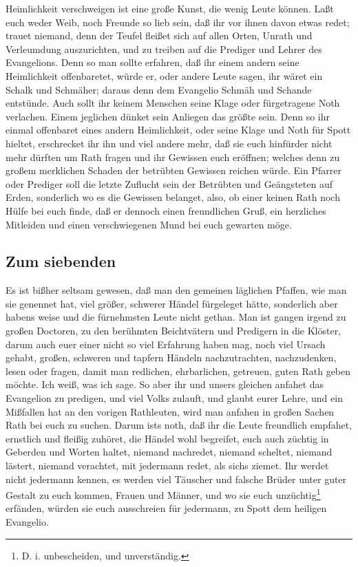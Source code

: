 Heimlichkeit verschweigen ist eine große Kunst, die wenig Leute können. Laßt euch weder Weib, noch Freunde so lieb sein, daß ihr vor ihnen davon etwas redet; trauet niemand, denn der Teufel fleißet sich auf allen Orten, Unrath und Verleumdung auszurichten, und zu treiben auf die Prediger und Lehrer des Evangelions. Denn so man sollte erfahren, daß ihr einem andern seine Heimlichkeit offenbaretet, würde er, oder andere Leute sagen, ihr wäret ein Schalk und Schmäher; daraus denn dem Evangelio Schmäh und Schande entstünde. Auch sollt ihr keinem Menschen seine Klage oder fürgetragene Noth verlachen. Einem jeglichen dünket sein Anliegen das größte sein. Denn so ihr einmal offenbaret eines andern Heimlichkeit, oder seine Klage und Noth für Spott hieltet, erschrecket ihr ihn und viel andere mehr, daß sie euch hinfürder nicht mehr dürften um Rath fragen und ihr
Gewissen euch eröffnen; welches denn zu großem merklichen Schaden der betrübten Gewissen reichen würde. Ein Pfarrer oder Prediger soll die letzte Zuflucht sein der Betrübten und Geängsteten auf Erden, sonderlich wo es die Gewissen belanget, also, ob einer keinen Rath noch Hülfe bei euch finde, daß er dennoch einen freundlichen Gruß, ein herzliches Mitleiden und einen verschwiegenen Mund bei euch gewarten möge.

\subsection{Zum siebenden}

Es ist bißher seltsam gewesen, daß man den gemeinen läglichen Pfaffen, wie man sie genennet hat, viel größer, schwerer Händel fürgeleget hätte, sonderlich aber habens weise und die fürnehmsten Leute nicht gethan. Man ist gangen irgend zu großen Doctoren, zu den berühmten Beichtvätern und Predigern in die Klöster, darum auch euer einer nicht so viel Erfahrung haben mag, noch viel Ursach gehabt, großen, schweren und tapfern Händeln nachzutrachten, nachzudenken, lesen oder fragen, damit man redlichen, ehrbarlichen, getreuen, guten Rath geben möchte. Ich weiß, was ich sage. So aber ihr und unsers gleichen anfahet das Evangelion zu predigen, und viel Volks zulauft, und glaubt eurer Lehre, und ein Mißfallen hat an den vorigen Rathleuten, wird man anfahen in großen Sachen Rath bei euch zu suchen. Darum ists noth, daß ihr die Leute freundlich empfahet, ernstlich und fleißig zuhöret, die Händel wohl begreifet, euch auch züchtig in Geberden und Worten haltet, niemand nachredet, niemand scheltet, niemand lästert, niemand verachtet, mit jedermann redet, als sichs ziemet. Ihr werdet nicht jedermann kennen, es werden viel Täuscher und falsche Brüder unter guter Gestalt zu euch kommen, Frauen und Männer, und wo sie euch unzüchtig\footnote{D. i. unbescheiden, und unverständig.} erfänden, würden sie euch ausschreien für jedermann, zu Spott dem heiligen Evangelio.

